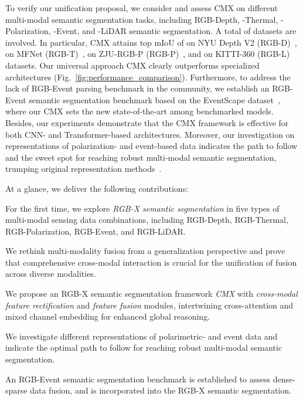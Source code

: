 \documentclass[journal]{IEEEtran}
\begin{document}
To verify our unification proposal, we consider and assess CMX on  different multi-modal semantic segmentation tasks, including RGB-Depth, -Thermal, -Polarization, -Event, and -LiDAR semantic segmentation. A total of  datasets are involved.
In particular, CMX attains top mIoU of  on NYU Depth V2 (RGB-D)~\cite{silberman2012nyu_dataset},  on MFNet (RGB-T)~\cite{ha2017mfnet},  on ZJU-RGB-P (RGB-P)~\cite{xiang2021polarization}, and  on KITTI-360 (RGB-L)~\cite{liao2021kitti360} datasets.
Our universal approach CMX clearly outperforms specialized architectures (Fig.~\ref{fig:performance_comparison}).
Furthermore, to address the lack of RGB-Event parsing benchmark in the community, 
we establish an RGB-Event semantic segmentation benchmark based on the EventScape dataset~\cite{gehrig2021eventscape_dataset}, where our CMX sets the new state-of-the-art among  benchmarked models.
Besides, our experiments demonstrate that the CMX framework is effective for both CNN- and Transformer-based architectures.
Moreover, our investigation on representations of polarization- and event-based data indicates the path to follow and the sweet spot for reaching robust multi-modal semantic segmentation, trumping original representation methods~\cite{xiang2021polarization,gehrig2021eventscape_dataset}.

At a glance, we deliver the following contributions:
\begin{compactitem}
    \item {For the first time, we explore \emph{RGB-X semantic segmentation} in five types of multi-modal sensing data combinations, including RGB-Depth, RGB-Thermal, RGB-Polarization, RGB-Event, and RGB-LiDAR.}
    \item {We rethink multi-modality fusion from a generalization perspective and prove that comprehensive cross-modal interaction is crucial for the unification of fusion across diverse modalities.}
    \item We propose an RGB-X semantic segmentation framework \emph{CMX} with \emph{cross-modal feature rectification} and \emph{feature fusion} modules, intertwining cross-attention and mixed channel embedding for enhanced global reasoning.
    \item {We investigate different representations of polarimetric- and event data and indicate the optimal path to follow for reaching robust multi-modal semantic segmentation.}
    \item {An RGB-Event semantic segmentation benchmark is established to assess dense-sparse data fusion, and is incorporated into the RGB-X semantic segmentation.} 
\end{compactitem}
\end{document}
